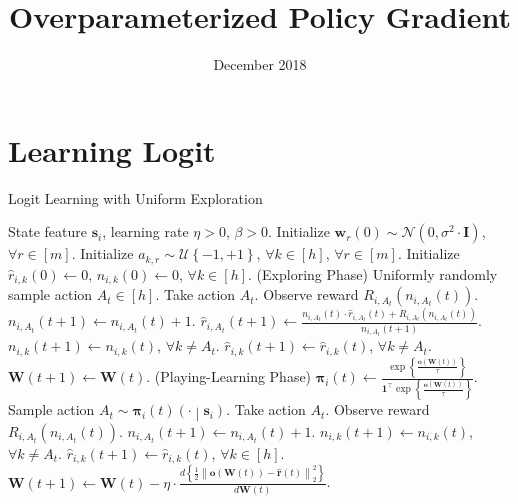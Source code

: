 \documentclass[10pt]{article}
\title{Overparameterized Policy Gradient}
\author{}
\date{December 2018}
\def\rvo{{\mathbf{o}}}
\def\rvr{{\mathbf{r}}}
\def\rvs{{\mathbf{s}}}
\def\rvw{{\mathbf{w}}}
\def\rvo{{\mathbf{o}}}
\def\rvone{{\mathbf{1}}}
\def\rvpi{{\boldsymbol{\pi}}}
\def\rmI{{\mathbf{I}}}
\def\rmW{{\mathbf{W}}}
\def\gN{{\mathcal{N}}}
\def\gU{{\mathcal{U}}}
\begin{document}

\section{Learning Logit}

\begin{algorithm}[h]
   \caption{Logit Learning with Uniform Exploration}
\label{alg:policy_gradient_uniform_exploration}
\begin{algorithmic}
    State feature $\rvs_i$, learning rate $\eta > 0$, $\beta > 0$.
   \STATE Initialize $\rvw_r(0) \sim \gN\left( 0, \sigma^2 \cdot \rmI \right)$, $\forall r \in [m]$. \STATE Initialize $a_{k, r} \sim \gU\left\{-1, +1\right\}$, $\forall k \in [h]$, $\forall r \in [m]$.
   \STATE Initialize $\hat{r}_{i,k}\left(0\right) \gets 0$, $n_{i,k}\left(0\right) \gets 0$, $\forall k \in [h]$.
   \STATE (Exploring Phase)
   \STATE Uniformly randomly sample action $A_{t} \in [h]$.
   \STATE Take action $A_{t}$. Observe reward $R_{i, A_{t}}\left(n_{i, A_{t}}\left(t\right) \right)$.
   \STATE $n_{i, A_{t}}\left(t+1\right) \gets n_{i, A_{t}}\left(t\right) + 1$.
   \STATE $\hat{r}_{i,A_{t}}\left(t+1\right) \gets \frac{n_{i, A_{t}}\left(t\right) \cdot \hat{r}_{i,A_{t}}\left(t\right) + R_{i, A_{t}}\left(n_{i, A_{t}}\left(t\right)\right) }{n_{i, A_{t}}\left(t+1\right)}$.
   \STATE $n_{i, k}\left(t+1\right) \gets n_{i, k}\left(t\right)$, $\forall k \not= A_t$.
   \STATE $\hat{r}_{i,k}\left(t+1\right) \gets \hat{r}_{i,k}\left(t\right)$, $\forall k \not= A_t$.
   \STATE $\rmW(t+1) \leftarrow \rmW(t)$.
   \ELSE
   \STATE (Playing-Learning Phase)
   \STATE $\rvpi_i\left(t\right) \gets \frac{ \exp\left\{ \frac{ \rvo\left( \rmW\left(t\right)\right) }{\tau} \right\} }{\rvone^\top \exp\left\{ \frac{ \rvo\left( \rmW\left(t\right)\right) }{\tau} \right\} } $.
   \STATE Sample action $A_{t} \sim \rvpi_{i}\left(t\right)\left(\cdot \middle| \rvs_i \right)$.
   \STATE Take action $A_{t}$. Observe reward $R_{i, A_{t}}\left(n_{i, A_{t}}\left(t\right) \right)$.
   \STATE $n_{i, A_{t}}\left(t+1\right) \gets n_{i, A_{t}}\left(t\right) + 1$.
   \STATE $n_{i, k}\left(t+1\right) \gets n_{i, k}\left(t\right)$, $\forall k \not= A_t$.
   \STATE $\hat{r}_{i,k}\left(t+1\right) \gets \hat{r}_{i,k}\left(t\right)$, $\forall k \in \left[ h \right]$.
   \STATE $\rmW(t+1) \leftarrow \rmW(t) - \eta \cdot \frac{d \left\{ \frac{1}{2} \left\| \rvo\left( \rmW\left(t\right)\right) - \hat{\rvr}\left(t\right) \right\|_2^2 \right\}}{d \rmW(t)}$.
   \ENDIF
   \ENDFOR
\end{algorithmic}
\end{algorithm}
\end{document}
